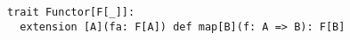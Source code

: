 \begin{algorithm}

\begin{verbatim}
trait Functor[F[_]]:
  extension [A](fa: F[A]) def map[B](f: A => B): F[B]
\end{verbatim}

\caption{Functor type class in Scala 3 %
\label{functor:scala}}
\end{algorithm}